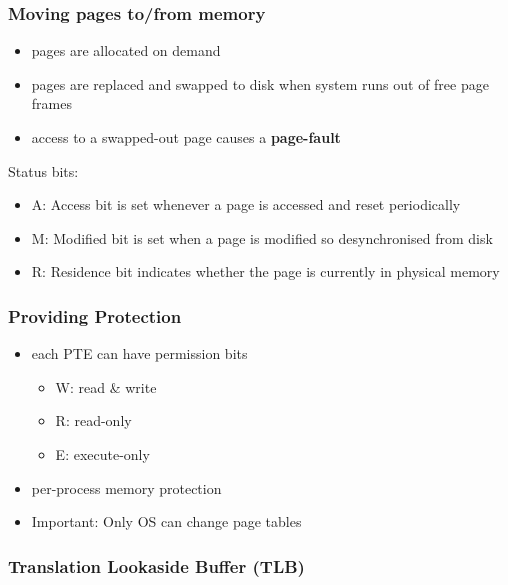 \documentclass{article}
\begin{document}
\subsubsection{Moving pages to/from memory}

\begin{itemize}
	\item pages are allocated on demand
	\item pages are replaced and swapped to disk when system runs out of free page frames
	\item access to a swapped-out page causes a \textbf{page-fault}
\end{itemize}
Status bits:
\begin{itemize}
	\item A: Access bit is set whenever a page is accessed and reset periodically
	\item M: Modified bit is set when a page is modified so desynchronised from disk
	\item R: Residence bit indicates whether the page is currently in physical memory
\end{itemize}

\subsubsection{Providing Protection}

\begin{itemize}
	\item each PTE can have permission bits \begin{itemize}
		      \item W: read \& write
		      \item R: read-only
		      \item E: execute-only
	      \end{itemize}
	\item per-process memory protection
	\item Important: Only OS can change page tables
\end{itemize}

\subsubsection{Translation Lookaside Buffer (TLB)}
\end{document}
